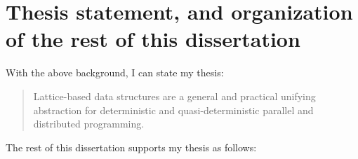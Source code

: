 \ifdefined\DISSERTATION
\section{Thesis statement, and organization of the rest of this dissertation}\label{s:intro-thesis}



With the above background, I can state my thesis:
\begin{quote}
  Lattice-based data structures are a general and practical unifying
  abstraction for deterministic and quasi-deterministic parallel and
  distributed programming.
\end{quote}
The rest of this dissertation supports my thesis as follows:
